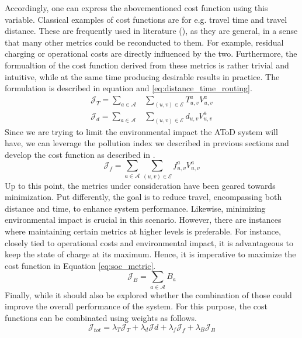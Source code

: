 Accordingly, one can express the abovementioned cost function using this variable. Classical examples of cost functions are for e.g. travel time and travel distance. These are frequently used in literature (\cite{7579135}), as they are general, in a sense that many other metrics could be reconducted to them. For example, residual charging or operational costs are directly influenced by the two. Furthermore, the formualtion of the cost function derived from these metrics is rather trivial and intuitive, while at the same time producing desirable results in practice. The formulation is described in equation  and \ref{eq:distance_time_routing}. \\
\begin{align}
	\mathcal{J}_T = \sum_{a \in \mathcal{A}} &\sum_{(u, v) \in \mathcal{E}} T^a_{ u,v} V^a_{u,v} \label{eq:travel_time_routing}\\
	\mathcal{J}_d = \sum_{a \in \mathcal{A}} &\sum_{(u, v) \in \mathcal{E}} d_{ u,v} V^a_{u,v}\label{eq:distance_time_routing}
\end{align} 
Since we are trying to limit the environmental impact the AToD system will have, we can leverage the pollution index we described in previous sections and develop the cost function as described in . 
\begin{equation}
	\mathcal{J}_f =\sum_{a \in \mathcal{A}} \sum_{(u, v) \in \mathcal{E}} f^a_{ u,v} V^a_{u,v} 
	\label{eq:pollution_metric}
\end{equation} 
Up to this point, the metrics under consideration have been geared towards minimization. Put differently, the goal is to reduce travel, encompassing both distance and time, to enhance system performance. Likewise, minimizing environmental impact is crucial in this scenario. However, there are instances where maintaining certain metrics at higher levels is preferable. For instance, closely tied to operational costs and environmental impact, it is advantageous to keep the state of charge at its maximum. Hence, it is imperative to maximize the cost function in Equation \ref{eq:soc_metric}.
\begin{equation}
	\mathcal{J}_B =\sum_{a \in \mathcal{A}}  B_a 
	\label{eq:soc_metric}
\end{equation} 
Finally, while it should also be explored whether the combination of those could improve the overall performance of the system. For this purpose, the cost functions can be combinated using weights as follows.  
\begin{equation}
	\mathcal{J}_{tot} = \lambda_T\mathcal{J}_T +\lambda_d\mathcal{J}d +\lambda_f\mathcal{J}_f +\lambda_B\mathcal{J}_B 
	\label{eq:combined_metrics}
\end{equation} \\

